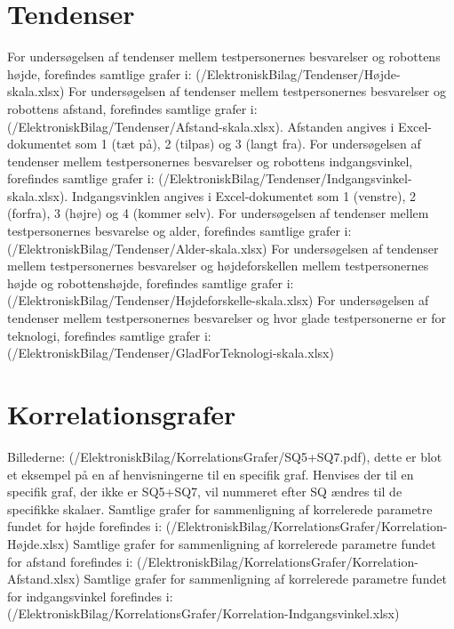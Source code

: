 \section{Tendenser}
\label{ElektroniskBilagTendenser}
%
For undersøgelsen af tendenser mellem testpersonernes besvarelser og robottens højde, forefindes samtlige grafer i: (/ElektroniskBilag/Tendenser/Højde-skala.xlsx)\blankline
%
For undersøgelsen af tendenser mellem testpersonernes besvarelser og robottens afstand, forefindes samtlige grafer i: (/ElektroniskBilag/Tendenser/Afstand-skala.xlsx). Afstanden angives i Excel-dokumentet som 1 (tæt på), 2 (tilpas) og 3 (langt fra).\blankline
%
For undersøgelsen af tendenser mellem testpersonernes besvarelser og robottens indgangsvinkel, forefindes samtlige grafer i: (/ElektroniskBilag/Tendenser/Indgangsvinkel-skala.xlsx). Indgangsvinklen angives i Excel-dokumentet som 1 (venstre), 2 (forfra), 3 (højre) og 4 (kommer selv).\blankline
%
For undersøgelsen af tendenser mellem testpersonernes besvarelse og alder, forefindes samtlige grafer i: (/ElektroniskBilag/Tendenser/Alder-skala.xlsx)\blankline
%
For undersøgelsen af tendenser mellem testpersonernes besvarelser og højdeforskellen mellem testpersonernes højde og robottenshøjde, forefindes samtlige grafer i: \\
(/ElektroniskBilag/Tendenser/Højdeforskelle-skala.xlsx)\blankline
%
For undersøgelsen af tendenser mellem testpersonernes besvarelser og hvor glade testpersonerne er for teknologi, forefindes samtlige grafer i:\\
(/ElektroniskBilag/Tendenser/GladForTeknologi-skala.xlsx)

\section{Korrelationsgrafer}
\label{ElektroniskBilagKorrelationsgrafer}
%
Billederne: (/ElektroniskBilag/KorrelationsGrafer/SQ5+SQ7.pdf), dette er blot et eksempel på en af henvisningerne til en specifik graf. Henvises der til en specifik graf, der ikke er SQ5+SQ7, vil nummeret efter SQ ændres til de specifikke skalaer.\blankline
%
Samtlige grafer for sammenligning af korrelerede parametre fundet for højde forefindes i: (/ElektroniskBilag/KorrelationsGrafer/Korrelation-Højde.xlsx)\blankline
%
Samtlige grafer for sammenligning af korrelerede parametre fundet for afstand forefindes i: (/ElektroniskBilag/KorrelationsGrafer/Korrelation-Afstand.xlsx)\blankline
%
Samtlige grafer for sammenligning af korrelerede parametre fundet for indgangsvinkel forefindes i: (/ElektroniskBilag/KorrelationsGrafer/Korrelation-Indgangsvinkel.xlsx)

